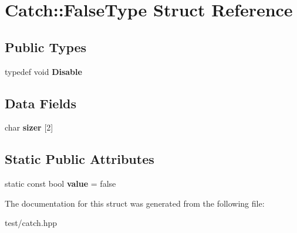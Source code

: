 \hypertarget{structCatch_1_1FalseType}{}\section{Catch\+:\+:False\+Type Struct Reference}
\label{structCatch_1_1FalseType}
\subsection*{Public Types}
\begin{DoxyCompactItemize}
\item 
typedef void {\bfseries Disable}\hypertarget{structCatch_1_1FalseType_a9b1d652f081c774bdaea5d061bb3372c}{}\label{structCatch_1_1FalseType_a9b1d652f081c774bdaea5d061bb3372c}

\end{DoxyCompactItemize}
\subsection*{Data Fields}
\begin{DoxyCompactItemize}
\item 
char {\bfseries sizer} \mbox{[}2\mbox{]}\hypertarget{structCatch_1_1FalseType_ad0a0468edb767e93e12459b816a89a88}{}\label{structCatch_1_1FalseType_ad0a0468edb767e93e12459b816a89a88}

\end{DoxyCompactItemize}
\subsection*{Static Public Attributes}
\begin{DoxyCompactItemize}
\item 
static const bool {\bfseries value} = false\hypertarget{structCatch_1_1FalseType_a34974ab2e06c898a360ba5f3b2d9ebe3}{}\label{structCatch_1_1FalseType_a34974ab2e06c898a360ba5f3b2d9ebe3}

\end{DoxyCompactItemize}


The documentation for this struct was generated from the following file\+:\begin{DoxyCompactItemize}
\item 
test/catch.\+hpp\end{DoxyCompactItemize}
